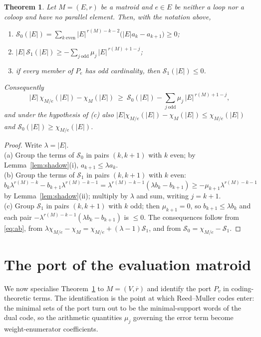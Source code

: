 \documentclass[11pt,a4paper]{article}
\newtheorem{theorem}{Theorem}[section]
\theoremstyle{definition}
\begin{document}
\begin{theorem}\label{thm:matroid-inequality}
Let $M=(E,r)$ be a matroid and $e\in E$ be neither a loop nor a coloop and have no parallel element. Then, with the notation above,
\begin{enumerate}[label=\textnormal{(\alph*)}]
\item $\mathcal S_0(|E|)=\sum_{k\ \mathrm{even}}|E|^{\,r(M)-k-2}\bigl(|E|a_k-a_{k+1}\bigr) \ge 0$;
\item $|E|\,\mathcal S_1(|E|)\ge-\sum_{j\ \mathrm{odd}}\mu_j\,|E|^{\,r(M)+1-j}$;
\item if every member of $P_e$ has odd cardinality, then $\mathcal S_1(|E|)\le0$.
\end{enumerate}
Consequently
\[
|E|\,\chi_{M/e}(|E|)-\chi_M(|E|)\ \ge\ \mathcal S_0(|E|)-\sum_{j\ \mathrm{odd}}\mu_j\,|E|^{\,r(M)+1-j},
\]
and under the hypothesis of \textnormal{(c)} also $|E|\chi_{M/e}(|E|)-\chi_M(|E|)\le\chi_{M/e}(|E|)$ and $\mathcal S_0(|E|)\ge\chi_{M/e}(|E|)$.
\end{theorem}

\begin{proof}
Write $\lambda=|E|$. \\
(a) Group the terms of $\mathcal S_0$ in pairs $(k,k+1)$ with $k$ even; by Lemma~\ref{lem:shadow}(i), $a_{k+1}\le\lambda a_k$. \\ 
(b) Group the terms of $\mathcal S_1$ in pairs $(k,k+1)$ with $k$ even: $b_k\lambda^{r(M)-k}-b_{k+1}\lambda^{r(M)-k-1}=\lambda^{r(M)-k-1}(\lambda b_k-b_{k+1})\ge-\mu_{k+1}\lambda^{r(M)-k-1}$ by Lemma~\ref{lem:shadow}(ii); multiply by $\lambda$ and sum, writing $j=k+1$. \\ 
(c) Group $\mathcal S_1$ in pairs $(k,k+1)$ with $k$ odd; then $\mu_{k+1}=0$, so $b_{k+1}\le\lambda b_k$ and each pair $-\lambda^{r(M)-k-1}(\lambda b_k-b_{k+1})$ is $\le0$. The consequences follow from \eqref{eq:ab}, from $\lambda\chi_{M/e}-\chi_M=\chi_{M/e}+(\lambda-1)\mathcal S_1$, and from $\mathcal S_0=\chi_{M/e}-\mathcal S_1$.
\end{proof}

\section{The port of the evaluation matroid}\label{subsec:rm-codes}

We now specialise Theorem~\ref{thm:matroid-inequality} to $M=(V,\overline r)$ and
identify the port $P_v$ in coding-theoretic terms. The identification is the point
at which Reed--Muller codes enter: the minimal sets of the port turn out to be the
minimal-support words of the dual code, so the arithmetic quantities $\mu_j$
governing the error term become weight-enumerator coefficients.
\end{document}
